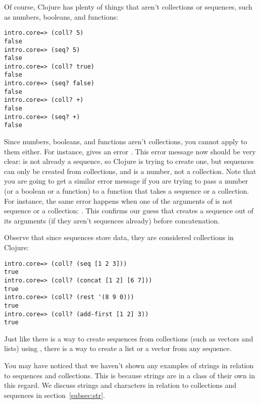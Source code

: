 Of course, Clojure has plenty of things that aren't collections or sequences, such as numbers, booleans, and functions:
\begin{framed}
\begin{verbatim}
intro.core=> (coll? 5)
false
intro.core=> (seq? 5)
false
intro.core=> (coll? true)
false
intro.core=> (seq? false)
false
intro.core=> (coll? +)
false
intro.core=> (seq? +)
false
\end{verbatim}
\end{framed} 
Since numbers, booleans, and functions aren't collections, you cannot apply  to them either. For instance,  gives an error . This error message now should be very clear:  is not already a sequence, so Clojure is trying to create one, but sequences can only be created from collections, and  is a number, not a collection. Note that you are going to get a similar error message if you are trying to pass a number (or a boolean or a function) to a function that takes a sequence or a collection. For instance, the same error   happens when one of the arguments of  is not sequence or a collection: . This confirms our guess that  creates a sequence out of its arguments (if they aren't sequences already) before concatenation. 

Observe that since sequences store data, they are considered collections in Clojure:
\begin{framed}
\begin{verbatim}
intro.core=> (coll? (seq [1 2 3]))
true
intro.core=> (coll? (concat [1 2] [6 7]))
true
intro.core=> (coll? (rest '(8 9 0)))
true
intro.core=> (coll? (add-first [1 2] 3))
true
\end{verbatim}
\end{framed} 


Just like there is a way to create sequences from collections (such as vectors and lists) using , there is a way to create a list or a vector from any sequence. 

You may have noticed that we haven't shown any examples of strings in relation to sequences and collections. This is because strings are in a class of their own in this regard. We discuss strings and characters in relation to collections and sequences in section~\ref{subsec:str}.


